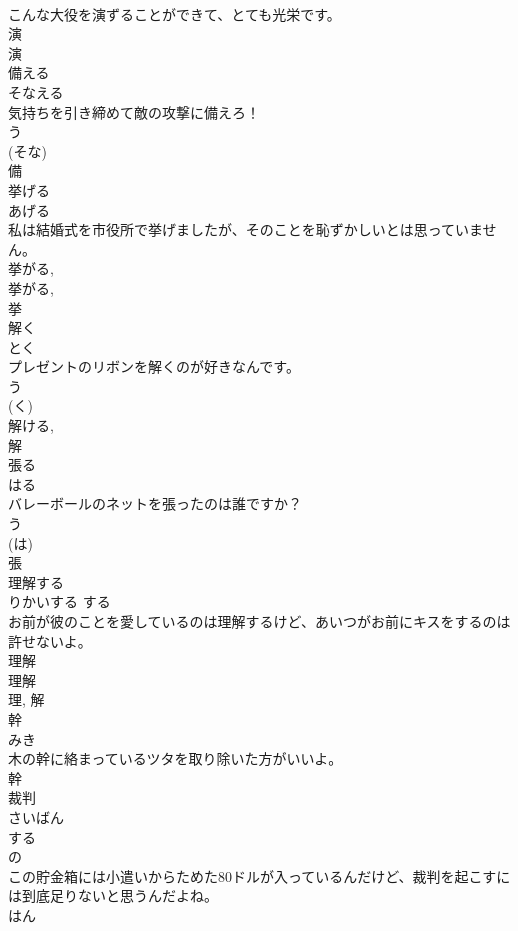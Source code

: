 \documentclass[8pt]{extreport}
\begin{document}
\begin{CJK}{UTF8}{min}
\\	こんな大役を演ずることができて、とても光栄です。	
\\	演 
\\	演	
\\	備える	
\\	そなえる	
\\	気持ちを引き締めて敵の攻撃に備えろ！	
\\	う 
\\	(そな) 
\\	備	
\\	挙げる	
\\	あげる	
\\	私は結婚式を市役所で挙げましたが、そのことを恥ずかしいとは思っていません。	
\\	挙がる, 
\\	挙がる, 
\\	挙	
\\	解く	
\\	とく	
\\	プレゼントのリボンを解くのが好きなんです。	
\\	う 
\\	(く) 
\\	解ける, 
\\	解	
\\	張る	
\\	はる	
\\	バレーボールのネットを張ったのは誰ですか？	
\\	う 
\\	(は) 
\\	張	
\\	理解する	
\\	りかいする	する 
\\	お前が彼のことを愛しているのは理解するけど、あいつがお前にキスをするのは許せないよ。	
\\	理解 
\\	理解 
\\	理, 解	
\\	幹	
\\	みき	
\\	木の幹に絡まっているツタを取り除いた方がいいよ。	
\\	幹	
\\	裁判	
\\	さいばん	
\\	する 
\\	の 
\\	この貯金箱には小遣いからためた80ドルが入っているんだけど、裁判を起こすには到底足りないと思うんだよね。	
\\	はん 

\end{CJK}
\end{document}
